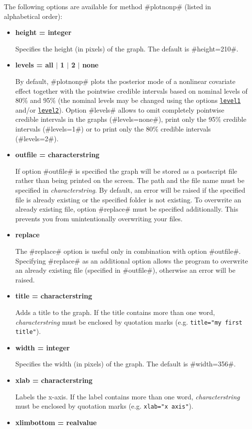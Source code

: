 The following options are available for method #plotnonp# (listed
in alphabetical order):

\begin{itemize}
\item {\bf height = integer}

Specifies the height (in pixels) of the graph. The default is
#height=210#.
\item {\bf levels = all $|$ 1 $|$ 2 $|$ none}

By default, #plotnonp# plots the posterior mode of a nonlinear
covariate effect together with the pointwise credible intervals
based on nominal levels of 80\% and 95\% (the nominal levels may
be changed using the options
\hyperref[remlreglevel1]{\texttt{level1}} and/or
\hyperref[remlreglevel2]{\texttt{level2}}). Option #levels# allows
to omit completely  pointwise credible intervals in the graphs
(#levels=none#), print only the 95\% credible intervals
(#levels=1#) or to print only the 80\% credible intervals
(#levels=2#).
\item {\bf outfile = characterstring}

If option #outfile# is specified the graph will be stored as a
postscript file rather than being printed on the screen. The path
and the file name must be specified in {\em characterstring}. By
default, an error will be raised if the specified file is already
existing or the specified folder is not existing. To overwrite  an
already existing file, option #replace# must be specified
additionally. This prevents you from unintentionally overwriting
your files.
\item {\bf replace}

The #replace# option is useful only in combination with option
#outfile#. Specifying #replace# as an additional option allows the
program to overwrite an already existing file (specified in
#outfile#), otherwise an error will be raised.

\item {\bf title = characterstring}

Adds a title to the graph. If the title contains more than one
word, {\em characterstring} must be enclosed by quotation marks (e.g.
\texttt{title="my first title"}).
\item {\bf width = integer}

Specifies the width (in pixels) of the graph. The default is
#width=356#.
\item {\bf xlab = characterstring}

Labels the x-axis. If the label contains more than one word, {\em
characterstring} must be enclosed by quotation marks (e.g.
\texttt{xlab="x axis"}). \item {\bf xlimbottom = realvalue}


\end{itemize}
